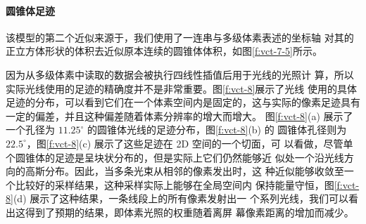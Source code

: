 \paragraph{圆锥体足迹}
该模型的第二个近似来源于，我们使用了一连串与多级体素表述的坐标轴 对其的正立方体形状的体积去近似原本连续的圆锥体体积，如图\ref{f:vct-7-5}所示。

因为从多级体素中读取的数据会被执行四线性插值后用于光线的光照计 算，所以实际光线使用的足迹的精确度并不是非常重要。图\ref{f:vct-8}展示了光线 使用的具体足迹的分布，可以看到它们在一个体素空间内是固定的，这与实际的像素足迹具有一定的偏差，并且这种偏差随着体素分辨率的增大而增大。 图\ref{f:vct-8}(a) 展示了一个孔径为 $11.25^{\circ}$ 的圆锥体光线的足迹分布，图\ref{f:vct-8}(b) 的 圆锥体孔径则为 $22.5^{\circ}$，图\ref{f:vct-8}(c) 展示了这些足迹在 2D 空间的一个切面，可 以看做，尽管单个圆锥体的足迹是呈块状分布的，但是实际上它们仍然能够近 似处一个沿光线方向的高斯分布。因此，当多条光束从相邻的像素发出时，这 种近似能够收敛至一个比较好的采样结果，这种采样实际上能够在全局空间内 保持能量守恒，图\ref{f:vct-8}(d) 展示了这种结果，一条线段上的所有像素发射出一 个系列光线，我们可以看出这得到了预期的结果，即体素光照的权重随着离屏 幕像素距离的增加而减少。

